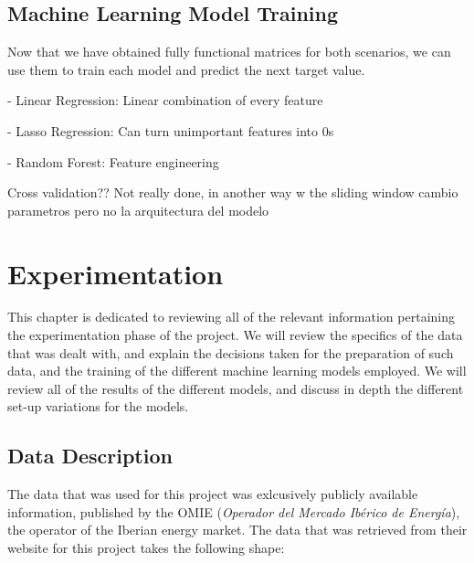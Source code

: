 \documentclass[12pt]{report} %
\begin{document}
\section{Machine Learning Model Training}

Now that we have obtained fully functional matrices for both scenarios, we can use them to train each model and predict the next target value.

- Linear Regression: Linear combination of every feature

- Lasso Regression: Can turn unimportant features into 0s

- Random Forest: Feature engineering



Cross validation?? Not really done, in another way w the sliding window
cambio parametros pero no la arquitectura del modelo







\chapter{Experimentation}
This chapter is dedicated to reviewing all of the relevant information pertaining the experimentation phase of the project. We will review the specifics of the data that was dealt with, and explain the decisions taken for the preparation of such data, and the training of the different machine learning models employed. We will review all of the results of the different models, and discuss in depth the different set-up variations for the models.

\section{Data Description} %
The data that was used for this project was exlcusively publicly available information, published by the OMIE (\textit{Operador del Mercado Ibérico de Energía}), the operator of the Iberian energy market. The data that was retrieved from their website \cite{omie_datos} for this project takes the following shape:
\end{document}
